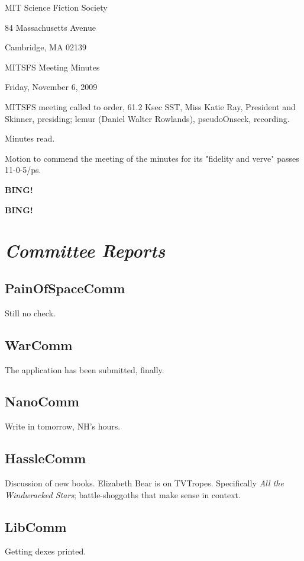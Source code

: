 \documentclass[10pt]{article}
\newcommand{\bing}{{\bf BING!} }
\newcommand{\goto}[1]{\bing \vskip 12pt \section*{{\em{#1}}}}
\begin{document}
\begin{center}

MIT Science Fiction Society

84 Massachusetts Avenue

Cambridge, MA 02139

\vspace{12pt}

MITSFS Meeting Minutes

Friday, November 6, 2009

\end{center}

\vspace{18pt}

\setlength{\parskip}{6pt}

\noindent
MITSFS meeting called to order, 61.2 Ksec SST,
Miss Katie Ray, President and Skinner, presiding; lemur (Daniel Walter Rowlands), pseudoOnseck, recording.

Minutes read.

Motion to commend the meeting of the minutes for its "fidelity and verve" passes 11-0-5/ps.

\bing

\goto{Committee Reports}

\subsection{PainOfSpaceComm}
Still no check.

\subsection{WarComm}
The application has been submitted, finally.

\subsection{NanoComm}
Write in tomorrow, NH's hours.

\subsection{HassleComm}
Discussion of new books.  Elizabeth Bear is on TVTropes.  Specifically \emph{All the Windwracked Stars}; battle-shoggoths that make sense in context.

\subsection{LibComm}
Getting dexes printed.
\end{document}

